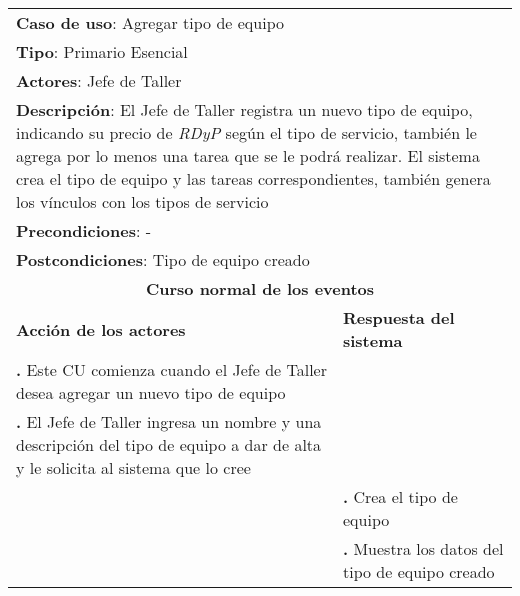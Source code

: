 \documentclass[12pt]{extarticle}
\begin{document}
    \newcommand\inc{\stepcounter{step}\textbf{\thestep. }}
    \newcommand\resetinc{\setcounter{step}{0}}
    \newcommand\raya{\noindent\rule{169mm}{0.8mm}\\}






	\begin{longtable}{ |p{8cm}|p{8cm}| }
		\hline
		\multicolumn{2}{|p{16cm}|}{\textbf{Caso de uso}: Agregar tipo de equipo}\\
		\multicolumn{2}{|p{16cm}|}{\textbf{Tipo}: Primario Esencial}\\
		\multicolumn{2}{|p{16cm}|}{\textbf{Actores}: Jefe de Taller}\\
        \multicolumn{2}{|p{16cm}|}{\textbf{Descripción}: El Jefe de Taller registra un nuevo tipo de equipo, indicando su precio de \textit{RDyP} según el tipo de servicio, también le agrega por lo menos una tarea que se le podrá realizar. El sistema crea el tipo de equipo y las tareas correspondientes, también genera los vínculos con los tipos de servicio}.\\
		\multicolumn{2}{|p{16cm}|}{\textbf{Precondiciones}: -}\\
		\multicolumn{2}{|p{16cm}|}{\textbf{Postcondiciones}: Tipo de equipo creado}\\
		\hline
		\multicolumn{2}{|c|}{\textbf{Curso normal de los eventos}}\\
		\hline
		\textbf{Acción de los actores} & \textbf{Respuesta del sistema}\\
		\hline
			\inc Este CU comienza cuando el Jefe de Taller desea agregar un nuevo tipo de equipo & \\
			\hline
            \inc El Jefe de Taller ingresa un nombre y una descripción del tipo de equipo a dar de alta y le solicita al sistema que lo cree & \\
			\hline
			& \inc Crea el tipo de equipo \\
			\hline
			& \inc Muestra los datos del tipo de equipo creado\\
			\hline



\end{longtable}
\end{document}
